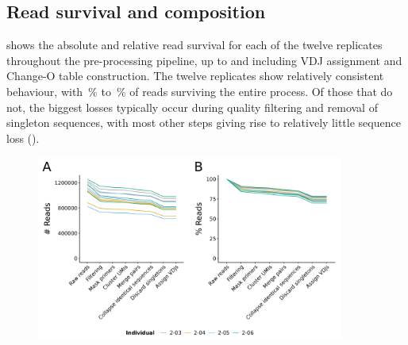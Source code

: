 \subsection{Read survival and composition}
\label{sec:igseq_pilot_composition}

 shows the absolute and relative read survival for each of the twelve replicates throughout the pre-processing pipeline, up to and including VDJ assignment and Change-O table construction. The twelve replicates show relatively consistent behaviour, with \,\% to \,\% of reads surviving the entire process. Of those that do not, the biggest losses typically occur during quality filtering and removal of singleton sequences, with most other steps giving rise to relatively little sequence loss ().

\begin{figure}
\centering
\includegraphics[width = 0.9\textwidth]{_Figures/png/pilot-read-survival-init.png}
\begin{subfigure}{0em}
\label{fig:igseq-pilot-read-survival-init-a}
\end{subfigure}
\begin{subfigure}{0em}
\label{fig:igseq-pilot-read-survival-init-b}
\end{subfigure}
\label{fig:igseq-pilot-read-survival-init}
\end{figure}

